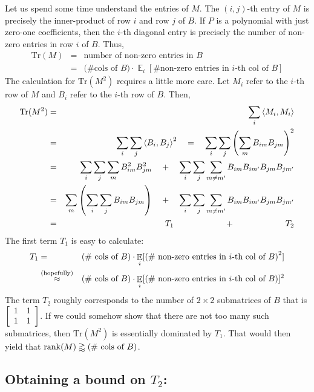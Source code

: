 Let us spend some time understand the entries of $M$. The $(i,j)$-th entry of $M$ is precisely the inner-product of row $i$ and row $j$ of $B$. If $P$ is a polynomial with just zero-one coefficients, then the $i$-th diagonal entry is precisely the number of non-zero entries in row $i$ of $B$. Thus,
\begin{eqnarray*}
\mathrm{Tr}(M) & = & \text{number of non-zero entries in $B$}\\
  & = & \text{(\# cols of $B$)} \cdot \mathop{\mathbb{E}}_i[\text{\# non-zero entries in $i$-th col of $B$}] 
\end{eqnarray*}
The calculation for $\mathrm{Tr}(M^2)$ requires a little more care. Let $M_i$ refer to the $i$-th row of $M$ and $B_i$ refer to the $i$-th row of $B$. Then,
\begin{eqnarray*}
\mathrm{Tr}(M^2) & = & \sum_{i} \left\langle M_i, M_i\right\rangle\\
 & = & \sum_{i} \sum_j \left\langle B_i, B_j\right\rangle^2 \quad = \quad\sum_{i} \sum_j \left(\sum_m B_{im} B_{jm}\right)^2\\
 & = & \sum_{i} \sum_j \sum_m B_{im}^2 B_{jm}^2  \quad + \quad \sum_i \sum_j \sum_{m\neq m'} B_{im}B_{im'}B_{jm}B_{jm'}\\
 & = & \sum_{m} \left(\sum_i \sum_j B_{im} B_{jm}\right)  \quad + \quad \sum_i \sum_j \sum_{m\neq m'} B_{im}B_{im'}B_{jm}B_{jm'}\\
 & = & \quad\quad\quad T_1 \quad\quad\quad\quad\quad\quad + \quad\quad\quad\quad\quad\quad T_2
\end{eqnarray*}
The first term $T_1$ is easy to calculate:
\begin{eqnarray*}
T_1 & = & \text{(\# cols of $B$)} \cdot \mathop{\mathbb{E}}_i[\left(\text{\# non-zero entries in $i$-th col of $B$}\right)^2] \\
 & \stackrel{\tiny \text{(hopefully)}}{\approx} & \text{(\# cols of $B$)} \cdot \mathop{\mathbb{E}}_i[\left(\text{\# non-zero entries in $i$-th col of $B$}\right)]^2
\end{eqnarray*}
The term $T_2$ roughly corresponds to the number of $2\times 2$ submatrices of $B$ that is $\left[\begin{array}{cc}1 & 1 \\ 1 & 1\end{array}\right]$. If we could somehow show that there are not too many such submatrices, then $\mathrm{Tr}(M^2)$ is essentially dominated by $T_1$. That would then yield that $\mathrm{rank}(M) \gtrapprox \text{(\# cols of $B$)}$. 

\subsection*{Obtaining a bound on $T_2$:}

